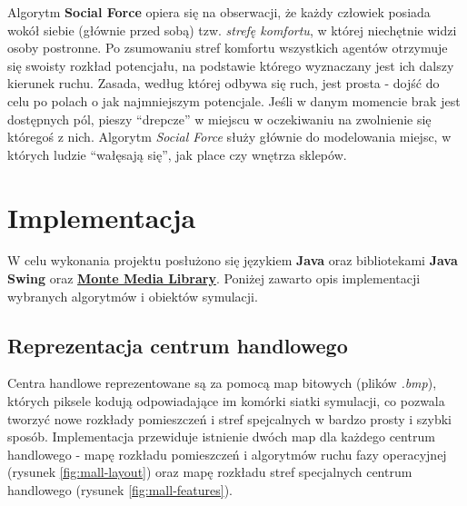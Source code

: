 \documentclass[a4paper, 12pt]{article}
\begin{document}
Algorytm \textbf{Social Force} opiera się na obserwacji, że każdy człowiek posiada wokół siebie (głównie przed sobą) tzw. \textit{strefę komfortu}, w której niechętnie widzi osoby postronne. Po zsumowaniu stref komfortu wszystkich agentów otrzymuje się swoisty rozkład potencjału, na podstawie którego wyznaczany jest ich dalszy kierunek ruchu. Zasada, według której odbywa się ruch, jest prosta - dojść do celu po polach o jak najmniejszym potencjale. Jeśli w danym momencie brak jest dostępnych pól, pieszy ``drepcze'' w miejscu w oczekiwaniu na zwolnienie się któregoś z nich. Algorytm \textit{Social Force} służy głównie do modelowania miejsc, w których ludzie ``wałęsają się'', jak place czy wnętrza sklepów.

\newpage
    \section{Implementacja}
    \label{sec:implementation}

    W celu wykonania projektu posłużono się językiem \textbf{Java} oraz bibliotekami \textbf{Java Swing} oraz \href{http://www.randelshofer.ch/monte/}{\textbf{Monte Media Library}}. Poniżej zawarto opis implementacji wybranych algorytmów i obiektów symulacji.

        \subsection{Reprezentacja centrum handlowego}
        \label{sec:mall-impl}

        Centra handlowe reprezentowane są za pomocą map bitowych (plików \emph{.bmp}), których piksele kodują odpowiadające im komórki siatki symulacji, co pozwala tworzyć nowe rozkłady pomieszczeń i stref spejcalnych w bardzo prosty i szybki sposób. Implementacja przewiduje istnienie dwóch map dla każdego centrum handlowego - mapę rozkładu pomieszczeń i algorytmów ruchu fazy operacyjnej (rysunek \ref{fig:mall-layout}) oraz mapę rozkładu stref specjalnych centrum handlowego (rysunek \ref{fig:mall-features}).
\end{document}

